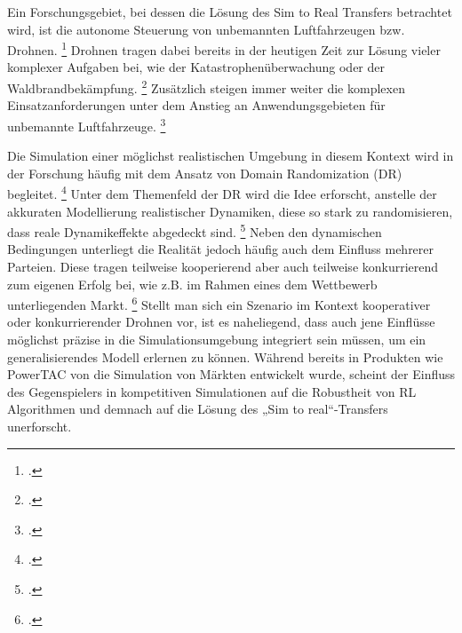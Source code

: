 Ein Forschungsgebiet, bei dessen die Lösung des Sim to Real Transfers betrachtet wird, ist die autonome Steuerung von unbemannten Luftfahrzeugen bzw. Drohnen. \footcite[Vgl.][S. 1]{Deshpande.2021}
Drohnen tragen dabei bereits in der heutigen Zeit zur Lösung vieler komplexer Aufgaben bei, wie der Katastrophenüberwachung oder der Waldbrandbekämpfung. \footcite[Vgl.][S. 1]{Hentati.2018}
Zusätzlich steigen immer weiter die komplexen Einsatzanforderungen unter dem Anstieg an Anwendungsgebieten für unbemannte Luftfahrzeuge. \footcite[Vgl.][S. 1]{Deshpande.2020}

Die Simulation einer möglichst realistischen Umgebung in diesem Kontext wird in der Forschung häufig mit dem Ansatz von Domain Randomization (DR) begleitet. \footcite[Vgl.][S. 1]{Sadeghi.2016}
Unter dem Themenfeld der DR wird die Idee erforscht, anstelle der akkuraten Modellierung realistischer Dynamiken, diese so stark zu randomisieren, dass reale Dynamikeffekte abgedeckt sind. \footcite[Vgl.][S. 4f.]{Zhao.2020}
Neben den dynamischen Bedingungen unterliegt die Realität jedoch häufig auch dem Einfluss mehrerer Parteien.
Diese tragen teilweise kooperierend aber auch teilweise konkurrierend zum eigenen Erfolg bei, wie z.B. im Rahmen eines dem Wettbewerb unterliegenden Markt. \footcite[Vgl.][S. 2]{COLLINS2022101217}
Stellt man sich ein Szenario im Kontext kooperativer oder konkurrierender Drohnen vor, ist es naheliegend, dass auch jene Einflüsse möglichst präzise in die Simulationsumgebung integriert sein müssen, um ein generalisierendes Modell erlernen zu können.
Während bereits in Produkten wie PowerTAC von \cite[][]{COLLINS2022101217} die Simulation von Märkten entwickelt wurde, scheint der Einfluss des Gegenspielers in kompetitiven Simulationen auf die Robustheit von RL Algorithmen und demnach auf die Lösung des „Sim to real“-Transfers unerforscht.